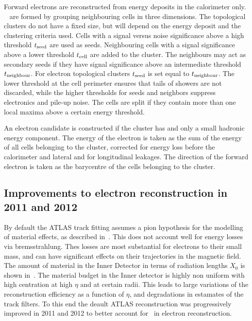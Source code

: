 Forward electrons are reconstructed from energy deposits in the calorimeter
only. ~\cite{Lampl:1099735} are formed by grouping neighbouring cells in three
dimensions. The topological clusters do not have a fixed size, but will depend
on the energy deposit and the clustering criteria used. Cells with a
signal versus noise significance above a high threshold $t_{\rm{seed}}$ are used as seeds.
Neighbouring cells with a signal significance above a lower threshold
$t_{\rm{cell}}$ are added to the cluster. The neighbours may act as
secondary seeds if they have signal significance above an intermediate threshold
$t_{\rm{neighbour}}$. For electron topological clusters $t_{\rm{seed}}$ is set
equal to $t_{\rm{neighbour}}$. The lower threshold at the cell perimeter ensures that
tails of showers are not discarded, while the higher thresholds for seeds and
neighbors suppress electronics and pile-up noise. The cells are split if they
contain more than one local maxima above a certain energy threshold. 

An electron candidate is constructed if the cluster has  and only a
small hadronic energy component. The energy
of the electron is taken as the sum of the energy of all cells belonging to the cluster,
corrected for energy loss before the calorimeter and lateral and for longitudinal
leakages. The direction of the forward electron is taken as the barycentre of the cells
belonging to the cluster.

\subsection{Improvements to electron reconstruction in 2011 and 2012}

By default the ATLAS track fitting assumes a pion hypothesis for the modelling
of material effects, as described in~. This does not account well for energy losses via
bremsstrahlung. Thes losses are most substantial for electrons to their small
mass, and can have significant effects on their trajectories in the magnetic
field. The amount of material in the Inner Detector in terms of radiation lengths
$X_{0}$ is shown in~. The material budget in the Inner detector
is highly non uniform with high centration at high $\eta$ and at certain radii.
This leads to large variations of the reconstruction efficiency as a function of
$\eta$, and degradations in estamates of the track filters. To this end the
deault ATLAS reconstruction was progressively improved in 2011 and 2012 to
better account for \brem\ in electron reconstruction.

